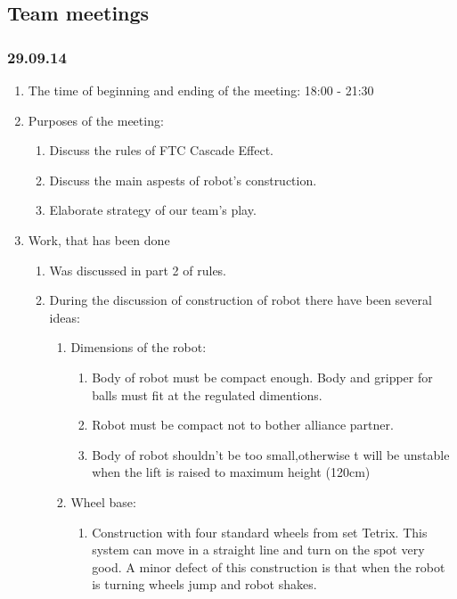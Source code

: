 \subsection{Team meetings}	
\subsubsection{29.09.14}

\begin{enumerate}
	\item The time of beginning and ending of the meeting: 18:00 - 21:30
	\item Purposes of the meeting:
	\begin{enumerate}
	  \item Discuss the rules of FTC Cascade Effect.
	  
	  \item Discuss the main aspests of robot's construction.
	  
      \item Elaborate strategy of our team's play. 
    \end{enumerate}
	\item Work, that has been done
	\begin{enumerate}
	  \item  Was discussed in part 2 of rules.
	  
	  \item During the discussion of construction of robot there have been several ideas: 
	  \begin{enumerate}
	    \item Dimensions of the robot:
	    \begin{enumerate}
	      \item Body of robot must be compact enough. Body and gripper for balls must fit at the regulated dimentions.
	      
	      \item Robot must be compact not to bother alliance partner.
	      
	      \item Body of robot shouldn't be too small,otherwise t will be unstable when the lift is raised to maximum height (120cm)
	      
	    \end{enumerate}
	    
	    \item Wheel base:
	    \begin{enumerate}
	      \item Construction with four standard wheels from set Tetrix. This system can move in a straight line and turn on the spot very good. A minor defect of this construction is that when the robot is turning wheels jump and robot shakes.  
	      

\end{enumerate}
\end{enumerate}
\end{enumerate}
\end{enumerate}
